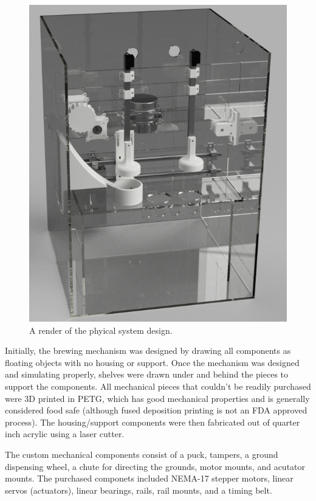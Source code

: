 \documentclass[conference]{IEEEtran}
\begin{document}
\begin{figure}
  \centering
    \includegraphics[width=1.8\columnwidth]{render}
    \caption{A render of the phyical system design.}
\end{figure}

Initially, the brewing mechanism was designed by drawing all components as
floating objects with no housing or support. Once the mechanism was designed and
simulating properly, shelves were drawn under and behind the pieces to support
the components. All mechanical pieces that couldn't be readily purchased
were 3D printed in PETG, which has good
mechanical properties and is generally considered food safe
(although fused deposition printing is not an FDA approved process). The
housing/support components were then fabricated out of quarter inch acrylic using a laser cutter.

The custom mechanical components consist of a puck, tampers, a ground dispensing
wheel, a chute for directing the grounds, motor mounts, and acutator mounts. The
purchased componets included NEMA-17 stepper motors, linear servos (actuators),
linear bearings, rails, rail mounts, and a timing belt.
\end{document}
